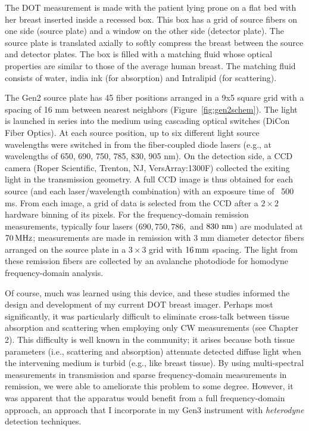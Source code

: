 The DOT measurement is made with the patient lying prone on a flat bed with her breast inserted inside a recessed box. This box has a grid of source fibers on one side (source plate) and a window on the other side (detector plate). The source plate is translated axially to softly compress the breast between the source and detector plates. The box is filled with a matching fluid whose optical properties are similar to those of the average human breast. The matching fluid consists of water, india ink (for absorption) and Intralipid (for scattering). 

The Gen2 source plate has 45 fiber positions arranged in a 9x5 square grid with a spacing of 16 mm between nearest neighbors (Figure~\ref{fig:gen2schem}). The light is launched in series into the medium using cascading optical switches (DiCon Fiber Optics). At each source position, up to six different light source wavelengths were switched in from the fiber-coupled diode lasers (e.g., at wavelengths of 650, 690, 750, 785, 830, 905 nm). On the detection side, a CCD camera (Roper Scientific, Trenton, NJ, VersArray:1300F) collected the exiting light in the transmission geometry. A full CCD image is thus obtained for each source (and each laser/wavelength combination) with an exposure time of ~500 ms. From each image, a grid of data is selected from the CCD after a $2\times 2$ hardware binning of its pixels. For the frequency-domain remission measurements, typically four lasers ($690, 750, 786,$ and $830~\rm{nm}$) are modulated at $70\,{\rm MHz}$; measurements are made in remission with 3 mm diameter detector fibers arranged on the source plate in a $3\times3$ grid with $16\,{\rm mm}$ spacing. The light from these remission fibers are collected by an avalanche photodiode for homodyne frequency-domain analysis.

Of course, much was learned using this device, and these studies informed the design and development of my current DOT breast imager. Perhaps most significantly, it was particularly difficult to eliminate cross-talk between tissue absorption and scattering when employing only CW measurements (see Chapter 2). This difficulty is well known in the community; it arises because both tissue parameters (i.e., scattering and absorption) attenuate detected diffuse light when the intervening medium is turbid (e.g., like breast tissue). By using multi-spectral measurements in transmission and sparse frequency-domain measurements in remission, we were able to ameliorate this problem to some degree. However, it was apparent that the apparatus would benefit from a full frequency-domain approach, an approach that I incorporate in my Gen3 instrument with \textit{heterodyne} detection techniques. 

